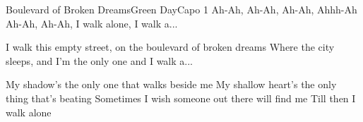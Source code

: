 \begin{song}{Boulevard of Broken Dreams}{Green Day}{Capo 1}
Ah-Ah, Ah-Ah, Ah-Ah, Ahhh-Ah
Ah-Ah, Ah-Ah, I walk alone, I walk a...

I walk this empty street, on the boulevard of broken dreams
Where the city sleeps, and I'm the only one and I walk a...

My shadow's the only one that walks beside me
My shallow heart's the only thing that's beating
Sometimes I wish someone out there will find me
Till then I walk alone

\end{song}
